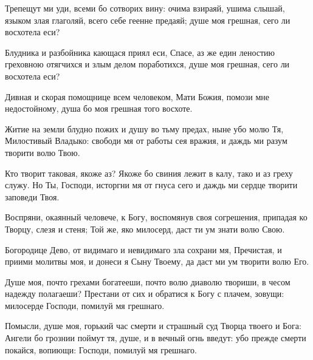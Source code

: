 \begin{mymulticols}

Трепещут ми уди, всеми бо сотворих вину: очима взираяй, ушима слышай, языком злая глаголяй, всего себе геенне предаяй; душе моя грешная, сего ли восхотела еси?

\slava

Блудника и разбойника кающася приял еси, Спасе, аз же един леностию греховною отягчихся и злым делом поработихся, душе моя грешная, сего ли восхотела еси?

\inyne

Дивная и скорая помощнице всем человеком, Мати Божия, помози мне недостойному, душа бо моя грешная того восхоте.




Житие на земли блудно пожих и душу во тьму предах, ныне убо молю Тя, Милостивый Владыко: свободи мя от работы сея вражия, и даждь ми разум творити волю Твою.


Кто творит таковая, якоже аз? Якоже бо свиния лежит в калу, тако и аз греху служу. Но Ты, Господи, исторгни мя от гнуса сего и даждь ми сердце творити заповеди Твоя.

\slava

Воспряни, окаянный человече, к Богу, воспомянув своя согрешения, припадая ко Творцу, слезя и стеня; Той же, яко милосерд, даст ти ум знати волю Свою.

\inyne

Богородице Дево, от видимаго и невидимаго зла сохрани мя, Пречистая, и приими молитвы моя, и донеси я Сыну Твоему, да даст ми ум творити волю Его.


Душе моя, почто грехами богатееши, почто волю диаволю твориши, в чесом надежду полагаеши? Престани от сих и обратися к Богу с плачем, зовущи: милосерде Господи, помилуй мя грешнаго.


Помысли, душе моя, горький час смерти и страшный суд Творца твоего и Бога: Ангели бо грознии поймут тя, душе, и в вечный огнь введут: убо прежде смерти покайся, вопиющи: Господи, помилуй мя грешнаго.



\end{mymulticols}
